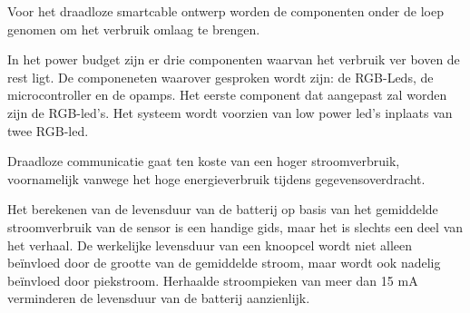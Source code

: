 Voor het draadloze smartcable ontwerp worden de componenten onder de loep genomen om het verbruik omlaag te brengen. 

In het power budget zijn er drie componenten waarvan het verbruik ver boven de rest ligt. De componeneten waarover gesproken wordt zijn: de RGB-Leds, de microcontroller en de opamps. Het eerste component dat aangepast zal worden zijn de RGB-led's. Het systeem wordt voorzien van low power led's inplaats van twee RGB-led. 


\begin{table}[H]
	\centering
	\caption{Power budget van de bioreactor module}
	\label{tab:power_budget_wisb}
\end{table}



Draadloze communicatie gaat ten koste van een hoger stroomverbruik, voornamelijk vanwege het hoge energieverbruik tijdens gegevensoverdracht. 

Het berekenen van de levensduur van de batterij op basis van het gemiddelde stroomverbruik van de sensor is een handige gids, maar het is slechts een deel van het verhaal. De werkelijke levensduur van een knoopcel wordt niet alleen beïnvloed door de grootte van de gemiddelde stroom, maar wordt ook nadelig beïnvloed door piekstroom. Herhaalde stroompieken van meer dan 15 mA verminderen de levensduur van de batterij aanzienlijk.


 